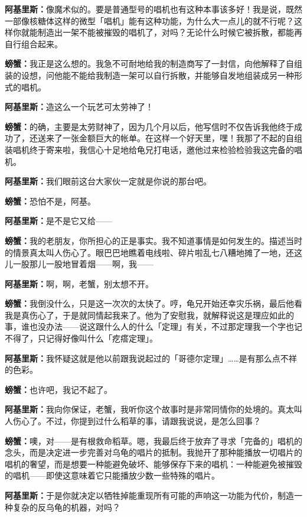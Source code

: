 \documentclass[
  12pt,
  twoside,
  openright,
  oldfontcommands,
]{memoir}
\newcommand{\dialogname}[1]{{\heifamily\bfseries #1}}
\begin{document}
\dialogname{阿基里斯：}像魔术似的。要是普通型号的唱机也有这种本事该多好！我是说，既然一部像核糖体这样的微型「唱机」能有这种功能，为什么大一点儿的就不行呢？这样你就能制造出一架不能被摧毁的唱机了，对吗？无论什么时候它被拆散，都能再自行组合起来。

\dialogname{螃蟹：}我正是这么想的。我急不可耐地给我的制造商写了一封信，向他解释了自组装的设想，问他能不能给我制造一架可以自行拆散，并能够自发地组装成另一种形式的唱机。

\dialogname{阿基里斯：}造这么一个玩艺可太劳神了！

\dialogname{螃蟹：}的确，主要是太劳财神了，因为几个月以后，他写信时不仅告诉我他终于成功了，还送来了一张金额巨大的帐单。在这样一个好天里，嘿！我那了不起的自组装唱机终于寄来啦，我信心十足地给龟兄打电话，邀他过来检验检验我这完备的唱机。

\dialogname{阿基里斯：}我们眼前这台大家伙一定就是你说的那台吧。

\dialogname{螃蟹：}恐怕不是，阿基。

\dialogname{阿基里斯：}是不是它又给------

\dialogname{螃蟹：}我的老朋友，你所担心的正是事实。我不知道事情是如何发生的。描述当时的情景真太叫人伤心了。眼巴巴地瞧着电线啦、碎片啦乱七八糟地摊了一地，还这儿一股那儿一股地冒着烟------啊，我------

\dialogname{阿基里斯：}啊，啊，老蟹，别太想不开。

\dialogname{螃蟹：}我倒没什么，只是这一次次的太快了。哼，龟兄开始还幸灾乐祸，最后他看我是真伤心了，于是就同情起我来了。他为了安慰我，就解释说这是理应如此的事，谁也没办法------说这跟什么人的什么「定理」有关，不过那定理我一个字也记不得了，只记得好像叫什么「疙瘩定理」。

\dialogname{阿基里斯：}我怀疑这就是他以前跟我说起过的「哥德尔定理」\ldots\ldots 是有那么点不祥的色彩。

\dialogname{螃蟹：}也许吧，我记不起了。

\dialogname{阿基里斯：}我向你保证，老蟹，我听你这个故事时是非常同情你的处境的。真太叫人伤心了。不过，你提到过什么稻草的事，请跟我说说，是怎么回事？

\dialogname{螃蟹：}噢，对------是有根救命稻草。嗯，我最后终于放弃了寻求「完备的」唱机的念头，而是决定进一步完善对乌龟的唱片的抵制。我抛开了那种能播放一切唱片的唱机的奢望，而是想要一种能避免破坏、能够保存下来的唱机：一种能避免被摧毁的唱机------即使这意味着它只能播放少数一些特殊的唱片。

\dialogname{阿基里斯：}于是你就决定以牺牲掉能重现所有可能的声响这一功能为代价，制造一种复杂的反乌龟的机器，对吗？
\end{document}
